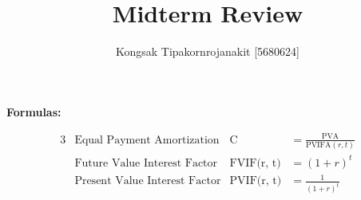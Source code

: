 \documentclass{article}
\begin{document}
\title{Midterm Review}
\author{Kongsak Tipakornrojanakit [5680624]}
\date{}
\maketitle


\textbf{Formulas:}


\begin{alignat}{3}
	\label{EPA}		&\mbox{Equal Payment Amortization} 		&\mbox{C} 			&=  \frac{\mbox{PVA}}{\mbox{PVIFA}(r, t)}\\
	\label{FVIF}	&\mbox{Future Value Interest Factor} 	&\mbox{FVIF(r, t)} 	&=  (1 + r)^t\\ 
	\label{PVIF}	&\mbox{Present Value Interest Factor} 	&\mbox{PVIF(r, t)} 	&=  \frac{1}{(1 + r)^t}
\end{alignat}
\end{document}

